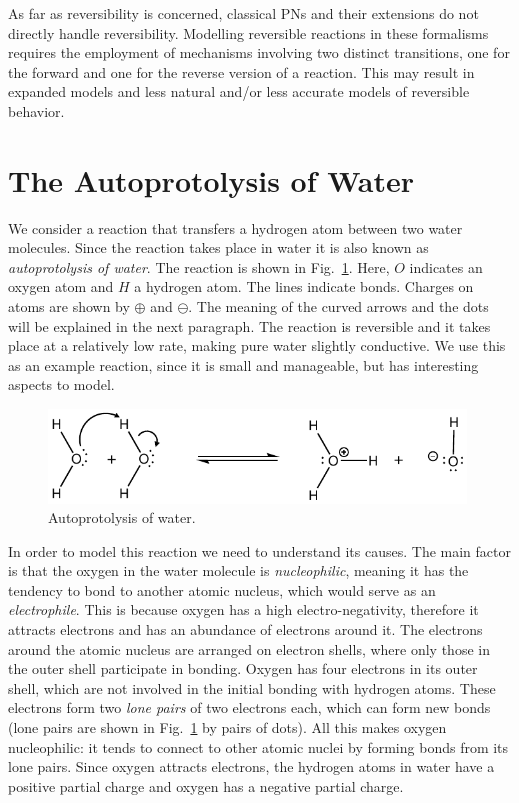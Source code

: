 \documentclass[runningheads]{llncs}
\begin{document}
As far as reversibility is concerned, classical PNs and their extensions do not
directly handle reversibility. Modelling reversible reactions in these formalisms requires the employment
of mechanisms involving two distinct transitions,
one for the forward and one for the reverse version of a reaction. This
may result in expanded models and less natural and/or less accurate
models of  reversible behavior.

\section{The Autoprotolysis of Water}

We consider a reaction that transfers a hydrogen atom between two water molecules. Since the
reaction takes place in water it is also known as \emph{autoprotolysis of water}. The reaction is shown 
in Fig.~\ref{fig:autoprotolysis}. Here, $O$ indicates an oxygen atom and $H$ a hydrogen atom. The lines indicate bonds. Charges on atoms are shown by $\oplus$ and $\ominus$. The meaning of the curved arrows and the dots will be explained in the next paragraph. The reaction is reversible and it takes place at a relatively 
low rate, making pure water slightly conductive. We use this as an example reaction, since it is small and manageable, but has interesting aspects to model.

\begin{figure}
\vspace{-2ex}\centering
\includegraphics[height=2.5cm]{autoprotolysis_corr3}
\vspace{-2ex}\caption{Autoprotolysis of water.}
\label{fig:autoprotolysis}
\vspace{-2ex}\end{figure}

In order to model this reaction we need to understand its causes. %
The main factor is that the oxygen in the water molecule is \emph{nucleophilic}, meaning it has the tendency to bond to another atomic nucleus, which would serve as an \emph{electrophile}. This is because oxygen has a high 
electro-negativity, therefore it attracts electrons and has an abundance of electrons around it. The electrons around the atomic nucleus are arranged on electron shells, where only those in the outer shell participate in bonding. Oxygen has four electrons in its outer shell, which are not involved in the initial bonding with hydrogen atoms. These electrons form two \emph{lone pairs} of two electrons each, which can form new bonds (lone pairs are shown in Fig.~\ref{fig:autoprotolysis} by pairs of dots). All this makes oxygen nucleophilic: it tends to connect 
to other atomic nuclei by forming bonds from its lone pairs. Since oxygen attracts electrons, the hydrogen atoms in water
have a positive partial charge and oxygen has a negative partial charge. 
\end{document}
